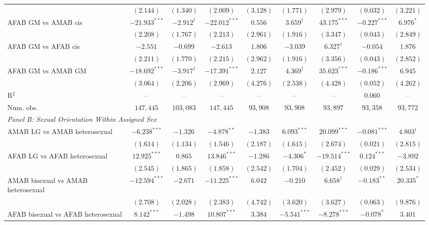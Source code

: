 \begin{table}[htpb!]
{\begin{tabular}{l c c c c c c c c}
 & $(2.144)$ & $(1.340)$ & $(2.009)$ & $(3.128)$ & $(1.771)$ & $(2.979)$ & $(0.032)$ & $(3.221)$ \\
AFAB GM vs AMAB cis & $-21.933^{***}$ & $-2.912^{\dagger}$ & $-22.012^{***}$ & $0.556$ & $3.659^{\dagger}$ & $43.175^{***}$ & $-0.227^{***}$ & $6.976^{*}$ \\
 & $(2.208)$ & $(1.767)$ & $(2.213)$ & $(2.961)$ & $(1.916)$ & $(3.347)$ & $(0.043)$ & $(2.849)$ \\
AFAB GM vs AFAB cis & $-2.551$ & $-0.699$ & $-2.613$ & $1.806$ & $-3.039$ & $6.327^{\dagger}$ & $-0.054$ & $1.876$ \\
 & $(2.211)$ & $(1.770)$ & $(2.215)$ & $(2.962)$ & $(1.916)$ & $(3.356)$ & $(0.043)$ & $(2.852)$ \\
AFAB GM vs AMAB GM & $-18.692^{***}$ & $-3.917^{\dagger}$ & $-17.391^{***}$ & $2.127$ & $4.369^{\dagger}$ & $35.623^{***}$ & $-0.186^{***}$ & $6.945$ \\
 & $(3.064)$ & $(2.206)$ & $(2.969)$ & $(4.276)$ & $(2.538)$ & $(4.428)$ & $(0.052)$ & $(4.262)$ \\
\hline
R$^2$ & -- & -- & -- & -- & -- & -- & $0.060$ & -- \\
Num. obs. & $147,445$ & $103,083$ & $147,445$ & $93,908$ & $93,908$ & $93,897$ & $93,358$ & $93,772$ \\
\hline
\multicolumn{9}{l}{\textit{Panel B: Sexual Orientation Within Assigned Sex}} \\
AMAB LG vs AMAB heterosexual & $-6.238^{***}$ & $-1.326$ & $-4.878^{**}$ & $-1.383$ & $6.093^{***}$ & $20.099^{***}$ & $-0.081^{***}$ & $4.803^{\dagger}$ \\
 & $(1.614)$ & $(1.134)$ & $(1.546)$ & $(2.187)$ & $(1.615)$ & $(2.674)$ & $(0.021)$ & $(2.815)$ \\
AFAB LG vs AFAB heterosexual & $12.925^{***}$ & $0.865$ & $13.846^{***}$ & $-1.286$ & $-4.306^{*}$ & $-19.514^{***}$ & $0.124^{***}$ & $-3.892$ \\
 & $(2.545)$ & $(1.865)$ & $(1.858)$ & $(2.542)$ & $(1.704)$ & $(2.452)$ & $(0.029)$ & $(2.534)$ \\
AMAB bisexual vs AMAB heterosexual & $-12.594^{***}$ & $-2.671$ & $-11.225^{***}$ & $6.042$ & $-0.210$ & $6.658^{\dagger}$ & $-0.183^{**}$ & $20.335^{*}$ \\
 & $(2.708)$ & $(2.028)$ & $(2.383)$ & $(4.742)$ & $(3.620)$ & $(3.627)$ & $(0.063)$ & $(9.876)$ \\
AFAB bisexual vs AFAB heterosexual & $8.142^{***}$ & $-1.498$ & $10.807^{***}$ & $3.384$ & $-5.541^{***}$ & $-8.278^{***}$ & $-0.078^{*}$ & $3.401$ \\

\end{tabular}}
\end{table}
